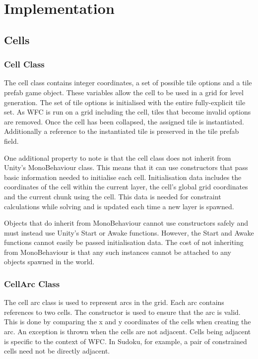\chapter{Implementation}
\section{Cells}
\subsection{Cell Class}\label{sec:cellClass}
The cell class contains integer coordinates, a set of possible tile options and a tile prefab game object. These variables allow the cell to be used in a grid for level generation. The set of tile options is initialised with the entire fully-explicit tile set. As WFC is run on a grid including the cell, tiles that become invalid options are removed. Once the cell has been collapsed, the assigned tile is instantiated. Additionally a reference to the instantiated tile is preserved in the tile prefab field.


One additional property to note is that the cell class does not inherit from Unity's MonoBehaviour class. This means that it can use constructors that pass basic information needed to initialise each cell. Initialisation data includes the coordinates of the cell within the current layer, the cell's global grid coordinates and the current chunk using the cell. This data is needed for constraint calculations while solving and is updated each time a new layer is spawned.

Objects that do inherit from MonoBehaviour cannot use constructors safely and must instead use Unity's Start or Awake functions. However, the Start and Awake functions cannot easily be passed initialisation data. The cost of not inheriting from MonoBehaviour is that any such instances cannot be attached to any objects spawned in the world.

\subsection{CellArc Class}
The cell arc class is used to represent arcs in the grid. Each arc contains references to two cells. The constructor is used to ensure that the arc is valid. This is done by comparing the x and y coordinates of the cells when creating the arc. An exception is thrown when the cells are not adjacent. Cells being adjacent is specific to the context of WFC. In Sudoku, for example, a pair of constrained cells need not be directly adjacent.

